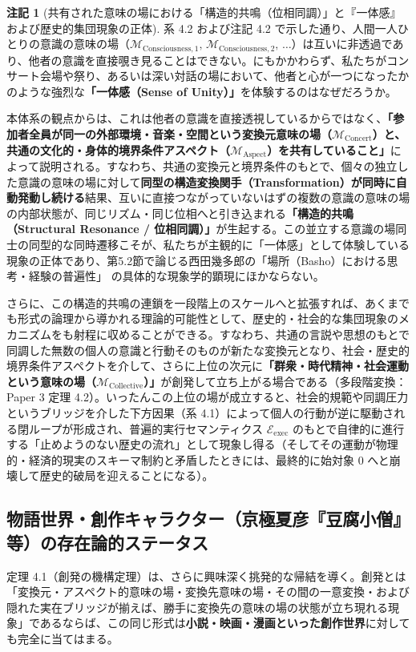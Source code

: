 \documentclass[11pt,a4paper]{ltjsarticle}
\theoremstyle{definition}
\newtheorem{remark}{注記}[section]
\theoremstyle{plain}
\begin{document}
\begin{remark}[共有された意味の場における「構造的共鳴（位相同調）」と『一体感』および歴史的集団現象の正体]
系 4.2 および注記 4.2 で示した通り、人間一人ひとりの意識の意味の場（$\mathcal{M}_{\mathrm{Consciousness}, 1},\, \mathcal{M}_{\mathrm{Consciousness}, 2},\, \dots$）は互いに非透過であり、他者の意識を直接覗き見ることはできない。にもかかわらず、私たちがコンサート会場や祭り、あるいは深い対話の場において、他者と心が一つになったかのような強烈な\textbf{「一体感（Sense of Unity）」}を体験するのはなぜだろうか。

本体系の観点からは、これは他者の意識を直接透視しているからではなく、\textbf{「参加者全員が同一の外部環境・音楽・空間という変換元意味の場（$\mathcal{M}_{\mathrm{Concert}}$）と、共通の文化的・身体的境界条件アスペクト（$\mathcal{M}_{\mathrm{Aspect}}$）を共有していること」}によって説明される。すなわち、共通の変換元と境界条件のもとで、個々の独立した意識の意味の場に対して\textbf{同型の構造変換関手（Transformation）が同時に自動発動し続ける}結果、互いに直接つながっていないはずの複数の意識の意味の場の内部状態が、同じリズム・同じ位相へと引き込まれる\textbf{「構造的共鳴（Structural Resonance / 位相同調）」}が生起する。この並立する意識の場同士の同型的な同時遷移こそが、私たちが主観的に「一体感」として体験している現象の正体であり、第5.2節で論じる西田幾多郎の「場所（Basho）における思考・経験の普遍性」\cite{Nishida1911,Nishida1927,Nishida1945} の具体的な現象学的顕現にほかならない。

さらに、この構造的共鳴の連鎖を一段階上のスケールへと拡張すれば、あくまでも形式の論理から導かれる理論的可能性として、歴史的・社会的な集団現象のメカニズムをも射程に収めることができる。すなわち、共通の言説や思想のもとで同調した無数の個人の意識と行動そのものが新たな変換元となり、社会・歴史的境界条件アスペクトを介して、さらに上位の次元に\textbf{「群衆・時代精神・社会運動という意味の場（$\mathcal{M}_{\mathrm{Collective}}$）」}が創発して立ち上がる場合である（多段階変換：Paper 3 \cite{Ota2026_3} 定理 4.2）。いったんこの上位の場が成立すると、社会的規範や同調圧力というブリッジを介した下方因果（系 4.1）によって個人の行動が逆に駆動される閉ループが形成され、普遍的実行セマンティクス $\mathcal{E}_{\mathrm{exec}}$ のもとで自律的に進行する「止めようのない歴史の流れ」として現象し得る（そしてその運動が物理的・経済的現実のスキーマ制約と矛盾したときには、最終的に始対象 $0$ へと崩壊して歴史的破局を迎えることになる）。
\end{remark}

\subsection{物語世界・創作キャラクター（京極夏彦『豆腐小僧』等）の存在論的ステータス}
定理 4.1（創発の機構定理）は、さらに興味深く挑発的な帰結を導く。創発とは「変換元・アスペクト的意味の場・変換先意味の場・その間の一意変換・および隠れた実在ブリッジが揃えば、勝手に変換先の意味の場の状態が立ち現れる現象」であるならば、この同じ形式は\textbf{小説・映画・漫画といった創作世界}に対しても完全に当てはまる。
\end{document}
